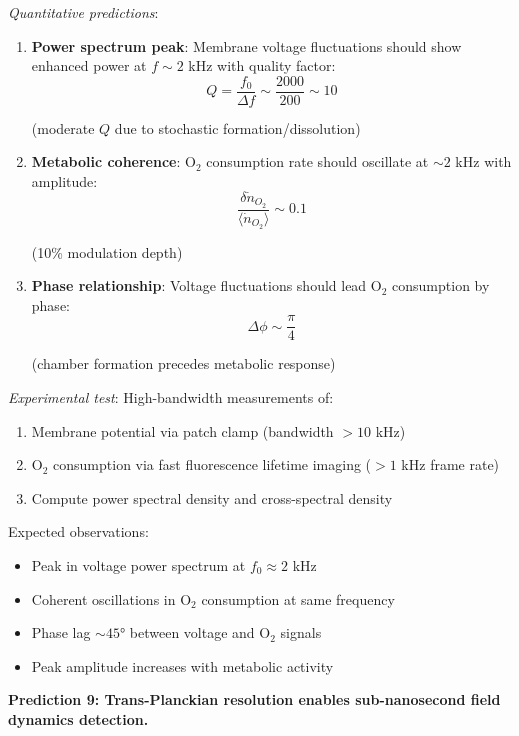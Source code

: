 \documentclass[twocolumn,10pt,aps,prd,superscriptaddress,floatfix,nofootinbib]{revtex4-2}
\theoremstyle{remark}
\begin{document}
\textit{Quantitative predictions}:
\begin{enumerate}
\item \textbf{Power spectrum peak}: Membrane voltage fluctuations should show enhanced power at $f \sim 2$ kHz with quality factor:
\begin{equation}
Q = \frac{f_0}{\Delta f} \sim \frac{2000}{200} \sim 10
\end{equation}

(moderate $Q$ due to stochastic formation/dissolution)

\item \textbf{Metabolic coherence}: O$_2$ consumption rate should oscillate at $\sim 2$ kHz with amplitude:
\begin{equation}
\frac{\delta\dot{n}_{O_2}}{\langle\dot{n}_{O_2}\rangle} \sim 0.1
\end{equation}

(10\% modulation depth)

\item \textbf{Phase relationship}: Voltage fluctuations should lead O$_2$ consumption by phase:
\begin{equation}
\Delta\phi \sim \frac{\pi}{4}
\end{equation}

(chamber formation precedes metabolic response)
\end{enumerate}

\textit{Experimental test}: High-bandwidth measurements of:
\begin{enumerate}
\item Membrane potential via patch clamp (bandwidth $>10$ kHz)
\item O$_2$ consumption via fast fluorescence lifetime imaging ($>1$ kHz frame rate)
\item Compute power spectral density and cross-spectral density
\end{enumerate}

Expected observations:
\begin{itemize}
\item Peak in voltage power spectrum at $f_0 \approx 2$ kHz
\item Coherent oscillations in O$_2$ consumption at same frequency
\item Phase lag $\sim 45°$ between voltage and O$_2$ signals
\item Peak amplitude increases with metabolic activity
\end{itemize}

\textbf{Prediction 9: Trans-Planckian resolution enables sub-nanosecond field dynamics detection.}
\end{document}
